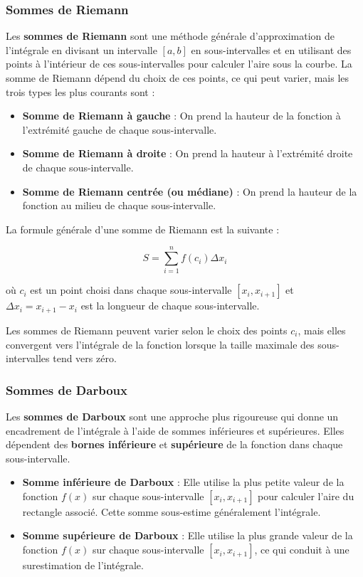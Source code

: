 \subsubsection{Sommes de Riemann}

Les \textbf{sommes de Riemann} sont une méthode générale d'approximation de l'intégrale en divisant un intervalle $[a, b]$ en sous-intervalles et en utilisant des points à l'intérieur de ces sous-intervalles pour calculer l'aire sous la courbe. La somme de Riemann dépend du choix de ces points, ce qui peut varier, mais les trois types les plus courants sont :

\begin{itemize}
    \item \textbf{Somme de Riemann à gauche} : On prend la hauteur de la fonction à l'extrémité gauche de chaque sous-intervalle.
    \item \textbf{Somme de Riemann à droite} : On prend la hauteur à l'extrémité droite de chaque sous-intervalle.
    \item \textbf{Somme de Riemann centrée (ou médiane)} : On prend la hauteur de la fonction au milieu de chaque sous-intervalle.
\end{itemize}

La formule générale d'une somme de Riemann est la suivante :

\[
S = \sum_{i=1}^{n} f(c_i) \Delta x_i
\]

où $c_i$ est un point choisi dans chaque sous-intervalle $[x_i, x_{i+1}]$ et $\Delta x_i = x_{i+1} - x_i$ est la longueur de chaque sous-intervalle.

Les sommes de Riemann peuvent varier selon le choix des points $c_i$, mais elles convergent vers l'intégrale de la fonction lorsque la taille maximale des sous-intervalles tend vers zéro.

\subsubsection{Sommes de Darboux}

Les \textbf{sommes de Darboux} sont une approche plus rigoureuse qui donne un encadrement de l'intégrale à l'aide de sommes inférieures et supérieures. Elles dépendent des \textbf{bornes inférieure} et \textbf{supérieure} de la fonction dans chaque sous-intervalle.

\begin{itemize}
    \item \textbf{Somme inférieure de Darboux} : Elle utilise la plus petite valeur de la fonction $f(x)$ sur chaque sous-intervalle $[x_i, x_{i+1}]$ pour calculer l'aire du rectangle associé. Cette somme sous-estime généralement l'intégrale.
    \item \textbf{Somme supérieure de Darboux} : Elle utilise la plus grande valeur de la fonction $f(x)$ sur chaque sous-intervalle $[x_i, x_{i+1}]$, ce qui conduit à une surestimation de l'intégrale.
\end{itemize}


